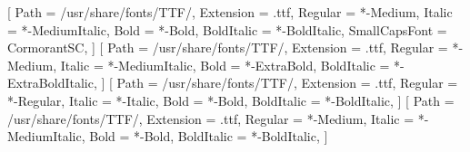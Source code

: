 \usepackage[margin=2.0cm,a5paper]{geometry}
\usepackage{fontspec}
\usepackage{graphicx}
\usepackage[greek,english,portuges]{babel}   %
\usepackage{indentfirst}
\setmainfont{Cormorant Garamond}[
    Path            = /usr/share/fonts/TTF/,
    Extension       = .ttf,
    Regular         = *-Medium,
    Italic          = *-MediumItalic,
    Bold            = *-Bold,
    BoldItalic      = *-BoldItalic,
    SmallCapsFont   = {CormorantSC},
]
\setsansfont{Fira Sans Condensed}[
    Path        = /usr/share/fonts/TTF/,
    Extension   = .ttf,
    Regular     = *-Medium,
    Italic      = *-MediumItalic,
    Bold        = *-ExtraBold,
    BoldItalic  = *-ExtraBoldItalic,
]
\setmonofont{Julia Mono}[
    Path        = /usr/share/fonts/TTF/,
    Extension   = .ttf,
    Regular     = *-Regular,
    Italic      = *-Italic,
    Bold        = *-Bold,
    BoldItalic  = *-BoldItalic,
]
\newfontfamily{}[
    Path            = /usr/share/fonts/TTF/,
    Extension       = .ttf,
    Regular         = *-Medium,
    Italic          = *-MediumItalic,
    Bold            = *-Bold,
    BoldItalic      = *-BoldItalic,
]
\def\versecolor{800000FF}
\newcommand{\XXX}[1]{\relax}
